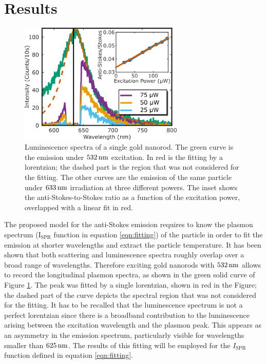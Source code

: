 \section{Results}
\begin{figure}[tp] \centering
\includegraphics[width=78.4mm]{Chapters/04_Anti-Stokes/Figures/02_Several_Intensities/02_several_intensities.png}
\caption{Luminescence spectra of a single gold nanorod. The green curve is the
emission under $532\,\textrm{nm}$ excitation. In red is the fitting by a lorentzian; the
dashed part is the region that was not considered for the fitting. The other
curves are the emission of the same particle under $633\,\textrm{nm}$ irradiation at three 
different powers. The inset shows the anti-Stokes-to-Stokes ratio as a function
of the excitation power, overlapped with a linear fit in red.}
	\label{fig:spectra_intensity}
\end{figure}

The proposed model for the anti-Stokes emission requires to know the plasmon
spectrum ($\textrm{I}_{\textrm{SPR}}$ function in equation \ref{eqn:fitting}) of
the particle in order to fit the emission at shorter wavelengths and extract the
particle temperature. It has been shown that both scattering and luminescence
spectra roughly overlap over a broad range of wavelengths\cite{Yorulmaz2012}. Therefore
exciting gold nanorods with $532\,\textrm{nm}$ allows to record the longitudinal plasmon
spectra, as shown in the green solid curve of Figure \ref{fig:spectra_intensity}. The
peak was fitted by a single lorentzian, shown in red in the Figure; the dashed
part of the curve depicts the spectral region that was not considered for the
fitting. It has to be recalled that the luminescence spectrum is not a perfect
lorentzian since there is a broadband contribution to the luminescence arising
between the excitation wavelength and the plasmon peak\cite{Boyd1986}. This
appears as an asymmetry in the emission spectrum, particularly visible for
wavelengths smaller than $625\,\textrm{nm}$. The results of this fitting will be employed
for the $I_\textrm{SPR}$ function defined in equation \ref{eqn:fitting}. 

